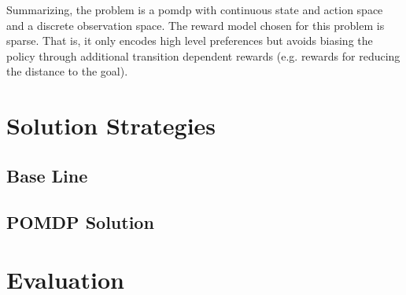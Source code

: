 Summarizing, the problem is a \ac{pomdp} with continuous state and action space
and a discrete observation space. The reward model chosen for this problem is
sparse. That is, it only encodes high level preferences but avoids biasing the
policy through additional transition dependent rewards (e.g. rewards for
reducing the distance to the goal).

\section{Solution Strategies}\label{sec:lp-solutions}

\subsection{Base Line}\label{sec:lp-baseline}

\subsection{POMDP Solution}\label{sec:lp-planners}

\section{Evaluation}\label{sec:lp-evaluation}
